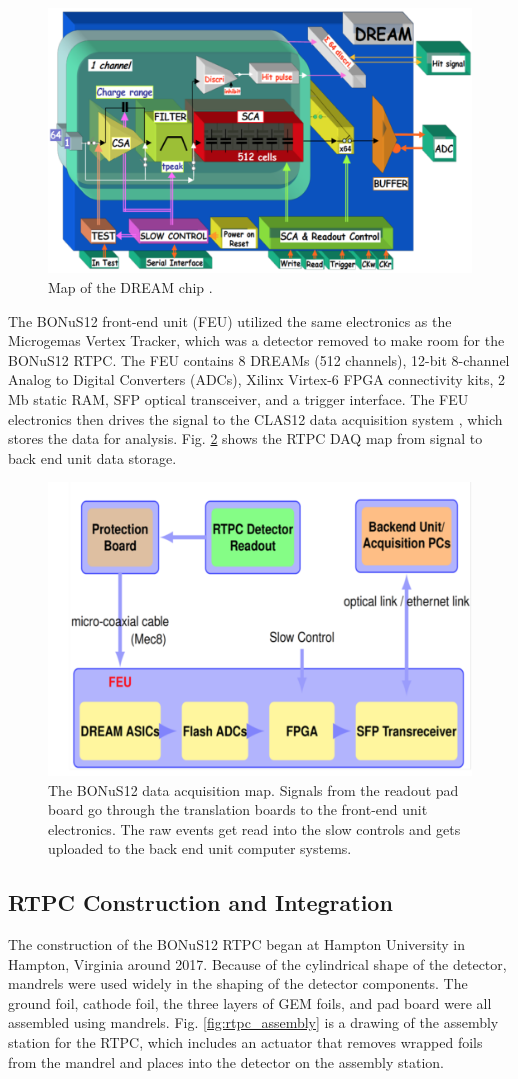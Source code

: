 \begin{figure}[h!]
	\centering
	\includegraphics[width=0.6\linewidth]{figures/DREAM_map.png}
	\caption[Map of the DREAM chip.]{Map of the DREAM chip \cite{dream}.}
	\label{fig:dreamn}
\end{figure}

The BONuS12 front-end unit (FEU) utilized the same electronics as the Microgemas Vertex Tracker, which was a detector removed to make room for the BONuS12 RTPC. The FEU contains 8 DREAMs (512 channels), 12-bit 8-channel Analog to Digital Converters (ADCs), Xilinx Virtex-6 FPGA connectivity kits, 2 Mb static RAM, SFP optical transceiver, and a trigger interface. The FEU electronics then drives the signal to the CLAS12 data acquisition system \cite{clas12:data}, which stores the data for analysis. Fig. \ref{fig:rtpc_daq} shows the RTPC DAQ map from signal to back end unit data storage.

\begin{figure}[h!]
	\centering
	\includegraphics[width=0.6\linewidth]{figures/rtpc_daq.png}
	\caption{The BONuS12 data acquisition map. Signals from the readout pad board go through the translation boards to the front-end unit electronics. The raw events get read into the slow controls and gets uploaded to the back end unit computer systems.}
	\label{fig:rtpc_daq}
\end{figure}

\subsection{RTPC Construction and Integration}
The construction of the BONuS12 RTPC began at Hampton University in Hampton, Virginia around 2017. Because of the cylindrical shape of the detector, mandrels were used widely in the shaping of the detector components. The ground foil, cathode foil, the three layers of GEM foils, and pad board were all assembled using mandrels. Fig. \ref{fig:rtpc_assembly} is a drawing of the assembly station for the RTPC, which includes an actuator that removes wrapped foils from the mandrel and places into the detector on the assembly station.

